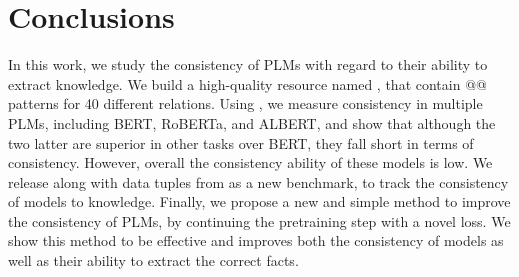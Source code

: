 \section{Conclusions}
\label{sec:conclusions}

In this work, we study the consistency of PLMs with regard to their ability to extract knowledge.
We build a high-quality resource named \resource{}, that contain @@ patterns for 40 different relations.
Using \resource{}, we measure consistency in multiple PLMs, including BERT, RoBERTa, and ALBERT, and show that although the two latter are superior in other tasks over BERT, they fall short in terms of consistency. However, overall the consistency ability of these models is low.
We release \resource{} along with data tuples from \cite{trex} as a new benchmark, to track the consistency of models to knowledge.
Finally, we propose a new and simple method to improve the consistency of PLMs, by continuing the pretraining step with a novel loss. We show this method to be effective and improves both the consistency of models as well as their ability to extract the correct facts.
